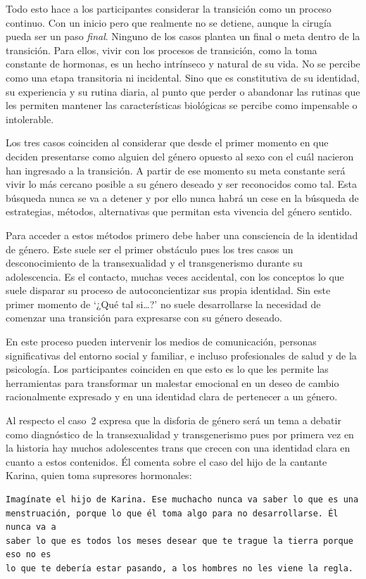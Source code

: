 Todo esto hace a los participantes considerar la transición como un proceso
continuo. Con un inicio pero que realmente no se detiene, aunque la cirugía
pueda ser un paso \emph{final}. Ninguno de los casos plantea un final o meta
dentro de la transición. Para ellos, vivir con los procesos de transición, como
la toma constante de hormonas, es un hecho intrínseco y natural de su vida. No
se percibe como una etapa transitoria ni incidental. Sino que es constitutiva de
su identidad, su experiencia y su rutina diaria, al punto que perder o abandonar
las rutinas que les permiten mantener las características biológicas se percibe
como impensable o intolerable.

Los tres casos coinciden al considerar que desde el primer momento en que
deciden presentarse como alguien del género opuesto al sexo con el cuál nacieron
han ingresado a la transición. A partir de ese momento su meta constante será
vivir lo más cercano posible a su género deseado y ser reconocidos como tal.
Esta búsqueda nunca se va a detener y por ello nunca habrá un cese en la
búsqueda de estrategias, métodos, alternativas que permitan esta vivencia del
género sentido.

Para acceder a estos métodos primero debe haber una consciencia de la identidad
de género. Este suele ser el primer obstáculo pues los tres casos un
desconocimiento de la transexualidad y el transgenerismo durante su
adolescencia. Es el contacto, muchas veces accidental, con los conceptos lo que
suele disparar su proceso de autoconcientizar sus propia identidad. Sin este
primer momento de ‘¿Qué tal si…?’ no suele desarrollarse la necesidad de
comenzar una transición para expresarse con su género deseado.

En este proceso pueden intervenir los medios de comunicación, personas
significativas del entorno social y familiar, e incluso profesionales de salud y
de la psicología. Los participantes coinciden en que esto es lo que les permite
las herramientas para transformar un malestar emocional en un deseo de cambio
racionalmente expresado y en una identidad clara de pertenecer a un género.

Al respecto el caso~2 expresa que la disforia de género será un tema a debatir
como diagnóstico de la transexualidad y transgenerismo pues por primera vez en
la historia hay muchos adolescentes trans que crecen con una identidad clara en
cuanto a estos contenidos. Él comenta sobre el caso del hijo de la cantante
Karina, quien toma supresores hormonales:

\begin{verbatim}
Imagínate el hijo de Karina. Ese muchacho nunca va saber lo que es una
menstruación, porque lo que él toma algo para no desarrollarse. Él nunca va a
saber lo que es todos los meses desear que te trague la tierra porque eso no es
lo que te debería estar pasando, a los hombres no les viene la regla.
\end{verbatim}

